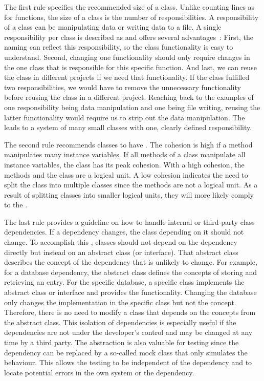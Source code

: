 The first rule specifies the recommended size of a class. Unlike counting lines as for functions, the size of a class is the number of responsibilities. A responsibility of a class can be manipulating data or writing data to a file. A single responsibility per class is described as  and offers several advantages~\cite{martin_clean_2009}: First, the naming can reflect this responsibility, so the class functionality is easy to understand.
Second, changing one functionality should only require changes in the one class that is responsible for this specific function. And last, we can reuse the class in different projects if we need that functionality. If the class fulfilled two responsibilities, we would have to remove the unnecessary functionality before reusing the class in a different project. Reaching back to the examples of one responsibility being data manipulation and one being file writing, reusing the latter functionality would require us to strip out the data manipulation.
The  leads to a system of many small classes with one, clearly defined responsibility.

The second rule recommends classes to have . The cohesion is high if a method manipulates many instance variables. If all methods of a class manipulate all instance variables, the class has its peak cohesion. With a high cohesion, the methods and the class are a logical unit. A low cohesion indicates the need to split the class into multiple classes since the methods are not a logical unit. As a result of splitting classes into smaller logical units, they will more likely comply to the .

The last rule provides a guideline on how to handle internal or third-party class dependencies. If a dependency changes, the class depending on it should not change. To accomplish this , classes should not depend on the dependency directly but instead on an abstract class (or interface). That abstract class describes the concept of the dependency that is unlikely to change. For example, for a database dependency, the abstract class defines the concepts of storing and retrieving an entry. For the specific database, a specific class implements the abstract class or interface and provides the functionality. Changing the database only changes the implementation in the specific class but not the concept. Therefore, there is no need to modify a class that depends on the concepts from the abstract class. This isolation of dependencies is especially useful if the dependencies are not under the developer's control and may be changed at any time by a third party. The abstraction is also valuable for testing since the dependency can be replaced by a so-called mock class that only simulates the behaviour. This allows the testing to be independent of the dependency and to locate potential errors in the own system or the dependency.

